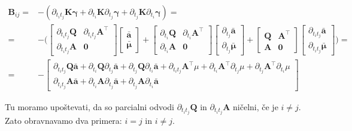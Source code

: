 \documentclass[isrm2, tisk]{fmfdelo}
\newcommand{\aimplicit}{\bar{\mathbf{a}}}
\newcommand{\muimplicit}{\bar{\boldsymbol{\mu}}}
\newcommand{\yimplicit}{\mathbf{\gamma}}
\newcommand{\qmat}{\mathbf{Q}}
\newcommand{\amat}{\mathbf{A}}
\begin{document}
\begin{equation}
    \begin{aligned}
        \mathbf{B}_{ij} =& - (\partial_{t_it_j} \mathbf{K} \yimplicit
    + \partial_{t_i} \mathbf{K} \partial_{t_j}\yimplicit
    + \partial_{t_j} \mathbf{K} \partial_{t_i}\yimplicit) = \\
    =& -\Bigg(\begin{bmatrix}
        \partial_{t_it_j}\qmat & \partial_{t_it_j} \amat^{\top} \\
        \partial_{t_it_j} \amat & \mathbf{0}
    \end{bmatrix} \begin{bmatrix}
        \aimplicit \\
        \muimplicit
    \end{bmatrix} + 
    \begin{bmatrix}
        \partial_{t_i}\qmat & \partial_{t_i} \amat^{\top} \\
        \partial_{t_i} \amat & \mathbf{0}
    \end{bmatrix} \begin{bmatrix}
        \partial_{t_j}\aimplicit \\
        \partial_{t_j}\muimplicit
    \end{bmatrix} +
    \begin{bmatrix}
        \qmat & \amat^{\top} \\
        \amat & \mathbf{0}
    \end{bmatrix} \begin{bmatrix}
        \partial_{t_it_j}\aimplicit \\
        \partial_{t_it_j}\muimplicit
    \end{bmatrix}\Bigg) = \\
    =& -\begin{bmatrix}
        \partial_{t_it_j}\qmat\aimplicit + \partial_{t_i}\qmat\partial_{t_j}\aimplicit + \partial_{t_j}\qmat\partial_{t_i}\aimplicit + \partial_{t_it_j} \amat^{\top}\mu + \partial_{t_i}\amat^{\top}\partial_{t_j}\mu + \partial_{t_j}\amat^{\top}\partial_{t_i}\mu \\
        \partial_{t_it_j}\amat\aimplicit + \partial_{t_i}\amat\partial_{t_j}\aimplicit + \partial_{t_j}\amat\partial_{t_i}\aimplicit
    \end{bmatrix}
    \end{aligned}
\end{equation}

Tu moramo upoštevati, da so parcialni odvodi $\partial_{t_it_j}\qmat$ in $\partial_{t_it_j}\amat$ ničelni, če je $i \neq j$. Zato obravnavamo dva primera: $i=j$ in $i \neq j$.
\end{document}
